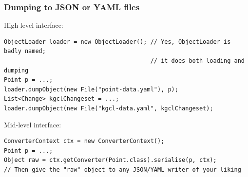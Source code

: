 \begin{frame}[fragile]
  \frametitle{Dumping to JSON or YAML files}

  High-level interface:

\begin{Verbatim}[frame=single,fontsize=\scriptsize]
ObjectLoader loader = new ObjectLoader(); // Yes, ObjectLoader is badly named;
                                          // it does both loading and dumping
Point p = ...;
loader.dumpObject(new File("point-data.yaml"), p);
List<Change> kgclChangeset = ...;
loader.dumpObject(new File("kgcl-data.yaml", kgclChangeset);
\end{Verbatim}

  \bigskip
  Mid-level interface:

\begin{Verbatim}[frame=single,fontsize=\scriptsize]
ConverterContext ctx = new ConverterContext();
Point p = ...;
Object raw = ctx.getConverter(Point.class).serialise(p, ctx);
// Then give the "raw" object to any JSON/YAML writer of your liking
\end{Verbatim}
\end{frame}

